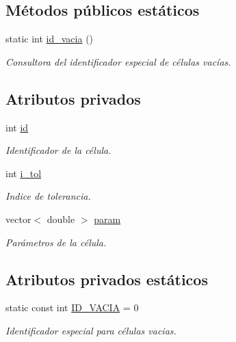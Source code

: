 \subsection*{Métodos públicos estáticos}
\begin{DoxyCompactItemize}
\item 
static int \hyperlink{class_celula_ad1f2960d79a418652964b6aeedaa8243}{id\+\_\+vacia} ()
\begin{DoxyCompactList}\small\item\em Consultora del identificador especial de células vacías. \end{DoxyCompactList}\end{DoxyCompactItemize}
\subsection*{Atributos privados}
\begin{DoxyCompactItemize}
\item 
int \hyperlink{class_celula_a0984a8b3deeed4979ed6f6141edc3c0c}{id}
\begin{DoxyCompactList}\small\item\em Identificador de la célula. \end{DoxyCompactList}\item 
int \hyperlink{class_celula_abda46be7b30a13909d9819c46238080b}{i\+\_\+tol}
\begin{DoxyCompactList}\small\item\em Indice de tolerancia. \end{DoxyCompactList}\item 
vector$<$ double $>$ \hyperlink{class_celula_a386c6da3af12b5662e3866675d60a4b7}{param}
\begin{DoxyCompactList}\small\item\em Parámetros de la célula. \end{DoxyCompactList}\end{DoxyCompactItemize}
\subsection*{Atributos privados estáticos}
\begin{DoxyCompactItemize}
\item 
static const int \hyperlink{class_celula_affff67b41ead0b1f3a3f4faad6c049ac}{I\+D\+\_\+\+V\+A\+C\+I\+A} = 0
\begin{DoxyCompactList}\small\item\em Identificador especial para células vacias. \end{DoxyCompactList}\end{DoxyCompactItemize}


